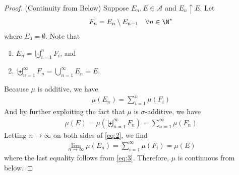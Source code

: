 \documentclass[thmcnt=section, 12pt, color=purple]{my-elegantbook}
\begin{document}
\begin{proof}
	(Continuity from Below) 
	Suppose $E_n, E \in \mathcal{A}$ and $E_n \uparrow E$.
	Let
	\begin{align*}
		F_n = E_{n} \setminus E_{n-1}
		\quad
		\forall n \in \N^\ast
	\end{align*}
	where $E_0 = \emptyset$.
	Note that 
	\begin{enumerate}
		\item $E_n = \biguplus_{i=1}^n F_i$, and
		\item $\biguplus_{n=1}^\infty F_n = \bigcup_{n=1}^\infty E_n = E$.
	\end{enumerate}
	Because $\mu$ is additive, we have 
	\begin{align}
		\mu(E_n) = \sum_{i=1}^n \mu(F_i)
		\label{eq:2}
	\end{align}
	And by further exploiting the fact that $\mu$ is $\sigma$-additive,
	we have 
	\begin{align}
		\mu(E) = \mu(\biguplus_{n=1}^\infty F_n)
		= \sum_{n=1}^\infty \mu(F_n)
		\label{eq:3}
	\end{align}
	Letting $n \to \infty$ on both sides of \eqref{eq:2},
	we find 
	\begin{align*}
		\lim_{n \to \infty} \mu(E_n)
		= \sum_{i=1}^\infty \mu(F_i)
		= \mu(E)
	\end{align*}
	where the last equality follows from \eqref{eq:3}.
	Therefore, $\mu$ is continuous from below.


\end{proof}
\end{document}
